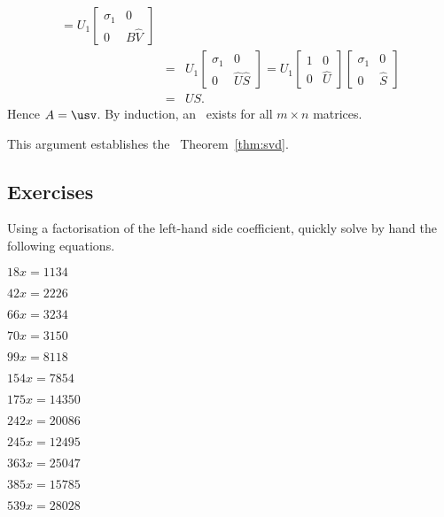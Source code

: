 \begin{enumerate}
\begin{eqnarray*}
=U_1\begin{bmatrix} \sigma_1&0 \\0&B\hat V \end{bmatrix}
\\&=&U_1\begin{bmatrix} \sigma_1&0 \\0&\hat U\hat S \end{bmatrix}
=U_1\begin{bmatrix} 1&0 \\0&\hat U \end{bmatrix}
\begin{bmatrix} \sigma_1&0 \\0&\hat S \end{bmatrix}
\\&=&US.
\end{eqnarray*}
Hence \(A=\usv\). 
By induction, an \svd\ exists for all \(m\times n\) matrices.
\end{enumerate}
This argument establishes the \svd\ Theorem~\ref{thm:svd}.







\subsection{Exercises}



\begin{exercise} \label{ex:} 
Using a factorisation of the left-hand side coefficient, quickly solve by hand the following equations.
\begin{parts}
\item \(18 x=1134\)
\item \(42 x=2226\)
\item \(66 x=3234\)
\item \(70 x=3150\)
\item \(99 x=8118\)
\item \(154 x=7854\)
\item \(175 x=14350\)
\item \(242 x=20086\)
\item \(245 x=12495\)
\item \(363 x=25047\)
\item \(385 x=15785\)
\item \(539 x=28028\)
\end{parts}
\end{exercise}




